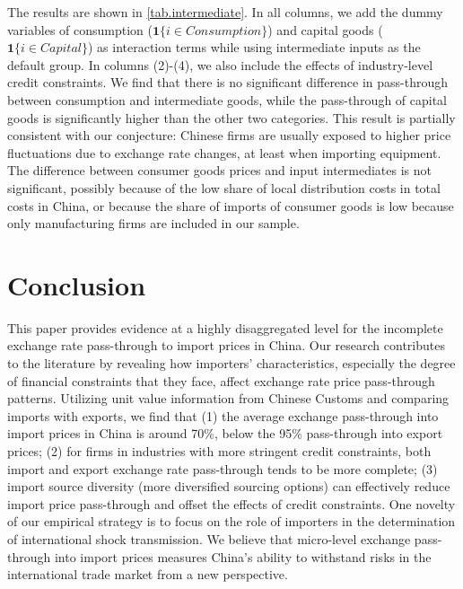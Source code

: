 The results are shown in \ref{tab.intermediate}. In all columns, we add the dummy variables of consumption ($\mathbf{1}\{i \in Consumption\}$) and capital goods ($\mathbf{1}\{i \in Capital\}$) as interaction terms while using intermediate inputs as the default group. In columns (2)-(4), we also include the effects of industry-level credit constraints. We find that there is no significant difference in pass-through between consumption and intermediate goods, while the pass-through of capital goods is significantly higher than the other two categories. This result is partially consistent with our conjecture: Chinese firms are usually exposed to higher price fluctuations due to exchange rate changes, at least when importing equipment. The difference between consumer goods prices and input intermediates is not significant, possibly because of the low share of local distribution costs in total costs in China, or because the share of imports of consumer goods is low because only manufacturing firms are included in our sample.

\section{Conclusion}\label{Conclusion}

This paper provides evidence at a highly disaggregated level for the incomplete exchange rate pass-through to import prices in China. Our research contributes to the literature by revealing how importers' characteristics, especially the degree of financial constraints that they face, affect exchange rate price pass-through patterns. Utilizing unit value information from Chinese Customs and comparing imports with exports, we find that (1) the average exchange pass-through into import prices in China is around 70\%, below the 95\% pass-through into export prices; (2) for firms in industries with more stringent credit constraints, both import and export exchange rate pass-through tends to be more complete; (3) import source diversity (more diversified sourcing options) can effectively reduce import price pass-through and offset the effects of credit constraints. One novelty of our empirical strategy is to focus on the role of importers in the determination of international shock transmission. We believe that micro-level exchange pass-through into import prices measures China's ability to withstand risks in the international trade market from a new perspective.

